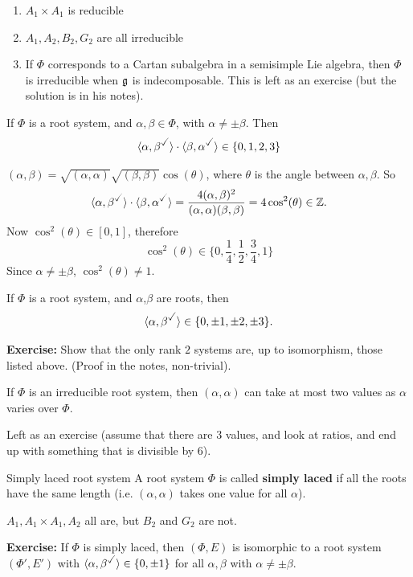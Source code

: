 \documentclass{article}
\begin{document}
\begin{exs*}\hspace{0.1cm}
    \begin{enumerate}
        \item $A_1 \times A_1$ is reducible
        \item $A_1, A_2, B_2, G_2$ are all irreducible
        \item If $\Phi$ corresponds to a Cartan subalgebra in a semisimple Lie algebra, then $\Phi$ is irreducible when $\mathfrak{g}$ is indecomposable. This is left as an exercise (but the solution is in his notes).
    \end{enumerate}
\end{exs*}
\begin{fancylem}{}
    If $\Phi$ is a root system, and $\alpha, \beta \in \Phi$, with $\alpha \neq \pm \beta$. Then \[ \langle \alpha, \beta^{\checked} \rangle \cdot \langle \beta, \alpha^{\checked} \rangle \in \{0,1,2,3\}\]
\end{fancylem}
\proof $(\alpha, \beta) = \sqrt{(\alpha,\alpha)}\sqrt{(\beta,\beta)} \cos(\theta)$, where $\theta$ is the angle between $\alpha, \beta$. So \[ \langle \alpha, \beta^{\checked} \rangle \cdot \langle \beta, \alpha^{\checked} \rangle = \frac{4(\alpha, \beta)^{2}}{(\alpha, \alpha)(\beta, \beta)} = 4\cos^{2}(\theta) \in \bbZ.\]
Now $\cos^{2}(\theta) \in [0,1]$, therefore \[\cos^{2}(\theta) \in \{0,\frac{1}{4},\frac{1}{2},\frac{3}{4},1\}\] Since $\alpha \neq \pm \beta$, $\cos^{2}(\theta) \neq 1$. \endproof 
\begin{corr}{}
    If $\Phi$ is a root system, and $\alpha$,$\beta$ are roots, then \[ \langle \alpha, \beta^{\checked} \rangle \in \{0,\pm 1, \pm 2, \pm 3\}.\]
\end{corr}
\textbf{Exercise: }Show that the only rank $2$ systems are, up to isomorphism, those listed above. (Proof in the notes, non-trivial).
\begin{corr}{}
    If $\Phi$ is an irreducible root system, then $(\alpha,\alpha)$ can take at most two values as $\alpha$ varies over $\Phi$.
\end{corr}
\proof Left as an exercise (assume that there are $3$ values, and look at ratios, and end up with something that is divisible by $6$).
\begin{fancydefine}{Simply laced root system}
    A root system $\Phi$ is called \textbf{simply laced} if all the roots have the same length (i.e. $(\alpha, \alpha)$ takes one value for all $\alpha$).
\end{fancydefine}
\begin{exs*} $A_1, A_1 \times A_1, A_2$ all are, but $B_2$ and $G_2$ are not.
\end{exs*}
\textbf{Exercise: }If $\Phi$ is simply laced, then $(\Phi, E)$ is isomorphic to a root system $(\Phi', E')$ with $\langle \alpha, \beta^{\checked} \rangle \in \{0, \pm 1\}$ for all $\alpha, \beta$ with $\alpha \neq \pm \beta$.
\end{document}
